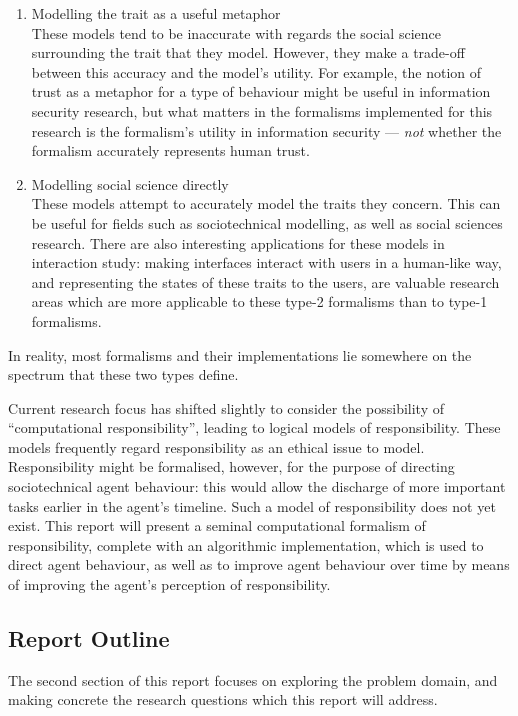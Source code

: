\begin{enumerate}
    \item Modelling the trait as a useful metaphor\\
    These models tend to be inaccurate with regards the social science surrounding the trait that they model. However, they make a trade-off between this accuracy and the model's utility. For example, the notion of trust as a metaphor for a type of behaviour might be useful in information security research, but what matters in the formalisms implemented for this research is the formalism's utility in information security --- \emph{not} whether the formalism accurately represents human trust.
    \item Modelling social science directly\\
    These models attempt to accurately model the traits they concern. This can be useful for fields such as sociotechnical modelling, as well as social sciences research. There are also interesting applications for these models in interaction study: making interfaces interact with users in a human-like way, and representing the states of these traits to the users, are valuable research areas which are more applicable to these type-2 formalisms than to type-1 formalisms.
\end{enumerate}

In reality, most formalisms and their implementations lie somewhere on the spectrum that these two types define.\par

Current research focus has shifted slightly to consider the possibility of ``computational responsibility'', leading to logical models of responsibility. These models frequently regard responsibility as an ethical issue to model. Responsibility might be formalised, however, for the purpose of directing sociotechnical agent behaviour: this would allow the discharge of more important tasks earlier in the agent's timeline. Such a model of responsibility does not yet exist. This report will present a seminal computational formalism of responsibility, complete with an algorithmic implementation, which is used to direct agent behaviour, as well as to improve agent behaviour over time by means of improving the agent's perception of responsibility.\par

\subsection{Report Outline}
The second section of this report focuses on exploring the problem domain, and making concrete the research questions which this report will address.\par

